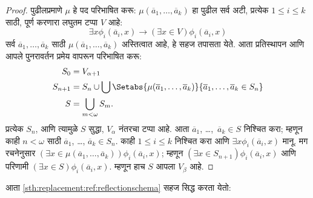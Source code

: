 \begin{proof}
पुढीलप्रमाणे $\mu$ हे पद परिभाषित करू: $\mu(\overline{a}_1, \ldots,
\overline{a}_k)$ हा पुढील सर्व अटी, प्रत्येक $1 \leq i \leq k$ साठी, पूर्ण करणारा लघुतम टप्पा $V$ आहे:
\[
\exists x\phi_i(\overline{a}_i, x) \rightarrow (\exists x \in V) \phi_i(\overline{a}_i, x)
\]
सर्व $\overline{a}_1, \ldots, \overline{a}_k$ साठी $\mu(\overline{a}_1, \ldots, \overline{a}_k)$ अस्तित्वात आहे, हे सहज तपासता येते. आता प्रतिस्थापन आणि आपले पुनरावर्तन प्रमेय वापरून परिभाषित करू:
\begin{align*}
  S_0 & = V_{\alpha+1}\\
  S_{n+1} & = S_n \cup \bigcup
  \Setabs{\mu(\overline{a}_1, \ldots, \overline{a}_k)}
  {\overline{a}_1, \ldots, \overline{a}_k \in S_n} \\
  S &= \bigcup_{m < \omega} S_m.
\end{align*}
प्रत्येक $S_n$, आणि त्यामुळे $S$ सुद्धा, $V_\alpha$ नंतरचा टप्पा आहे. आता $\overline{a}_1$, \dots,~$\overline{a}_k \in S$ निश्चित करा; म्हणून काही $n <
\omega$ साठी $\overline{a}_1$, \dots, $\overline{a}_k \in S_n$. काही $1 \leq i \leq k$ निश्चित करा आणि $\exists x
\phi_i(\overline{a}_i,x)$ मानू. मग रचनेनुसार $(\exists x \in \mu(\overline{a}_1,
\ldots, \overline{a}_k))\phi_i(\overline{a}_i, x)$; म्हणून $(\exists x \in S_{n+1})\phi_i(\overline{a}_i, x)$ आणि परिणामी $(\exists x \in S)\phi_i(\overline{a}_i, x)$. म्हणून हाच $S$ आपला $V_\beta$ आहे.
\end{proof}
\noindent
आता \ref{sth:replacement:ref:reflectionschema} सहज सिद्ध करता येतो:

